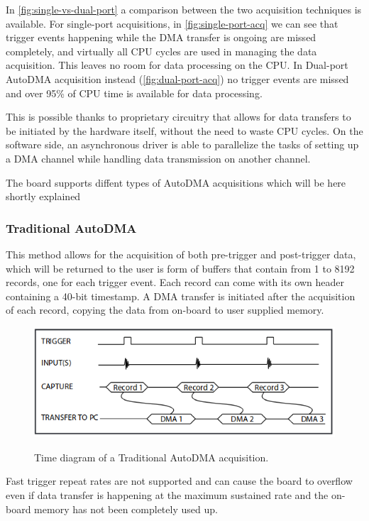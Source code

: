     In \autoref{fig:single-vs-dual-port} a comparison between the two acquisition techniques is available. For single-port acquisitions, in \autoref{fig:single-port-acq} we can see that trigger events happening while the \ac{DMA} transfer is ongoing are missed completely, and virtually all CPU cycles are used in managing the data acquisition. This leaves no room for data processing on the CPU. In Dual-port AutoDMA acquisition instead (\autoref{fig:dual-port-acq}) no trigger events are missed and over 95\% of CPU time is available for data processing. 
    
    This is possible thanks to proprietary circuitry that allows for data transfers to be initiated by the hardware itself, without the need to waste CPU cycles. On the software side, an asynchronous driver is able to parallelize the tasks of setting up a DMA channel while handling data transmission on another channel. 


	The board supports diffent types of AutoDMA acquisitions which will be here shortly explained 

	\subsubsection{Traditional AutoDMA}
	This method allows for the acquisition of both pre-trigger and post-trigger data, which will be returned to the user is form of buffers that contain from 1 to 8192 records, one for each trigger event. Each record can come with its own header containing a 40-bit timestamp. A DMA transfer is initiated after the acquisition of each record, copying the data from on-board to user supplied memory.
	
	 \begin{figure}[bth]
		\myfloatalign
		{\includegraphics[width=.75\linewidth]{gfx/ch3/traditional-autodma}}
		\caption{Time diagram of a Traditional AutoDMA acquisition.}\label{fig:traditional-autodma}
	\end{figure}
	
	Fast trigger repeat rates are not supported and can cause the board to overflow even if data transfer is happening at the maximum sustained rate and the on-board memory has not been completely used up. 
	
